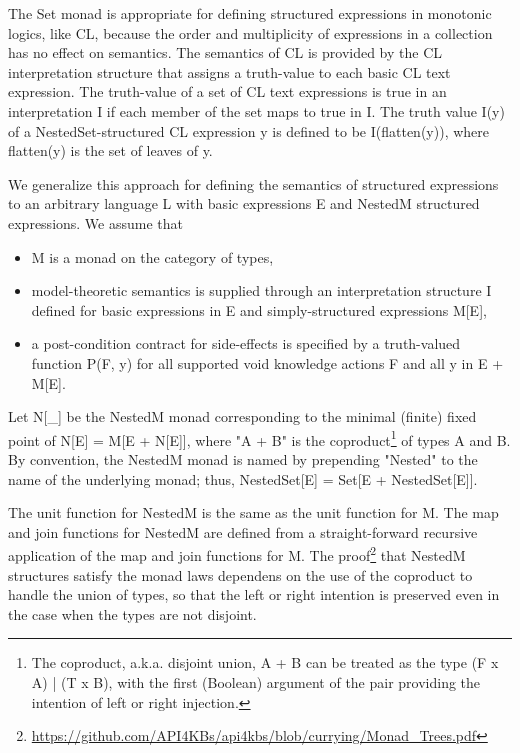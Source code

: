 \documentclass[runningheads]{llncs}
\begin{document}
The Set monad is appropriate for defining structured expressions in monotonic logics, like CL, because the order and multiplicity of expressions in a collection has no effect on semantics. The semantics of CL is provided by the CL interpretation structure that assigns a truth-value to each basic CL text expression. The truth-value of a set of CL text expressions is true in an interpretation I if each member of the set maps to true in I. The truth value I(y) of a NestedSet-structured CL expression y is defined to be I(flatten(y)), where flatten(y) is the set of leaves of y.

We generalize this approach for defining the semantics of structured expressions to an arbitrary language L with basic expressions E and NestedM structured expressions. We assume that 
\begin{itemize}
\item M is a monad on the category of types,
\item model-theoretic semantics is supplied through an interpretation structure I defined for basic expressions in E and simply-structured expressions M[E],
\item a post-condition contract for side-effects is specified by a truth-valued function P(F, y) for all supported void knowledge actions F and all y in E + M[E].
\end{itemize}

Let N[\_] be the NestedM monad corresponding to the minimal (finite) fixed point of N[E] = M[E + N[E]], where "A + B" is the coproduct\footnote{The coproduct, a.k.a. disjoint union, A + B can be treated as the type (F x A) | (T x B), with the first (Boolean) argument of the pair providing the intention of left or right injection.} of types A and B.
By convention, the NestedM monad is named by prepending "Nested" to the name of the underlying monad; thus, NestedSet[E] = Set[E + NestedSet[E]].

The unit function for NestedM is the same as the unit function for M.  The map and join functions for NestedM are defined from a straight-forward recursive application of the map and join functions for M.
The proof\footnote{\url{https://github.com/API4KBs/api4kbs/blob/currying/Monad_Trees.pdf}\label{note:proof}} that NestedM structures satisfy the monad laws dependens on the use of the coproduct to handle the union of types, so that the left or right intention is preserved even in the case when the types are not disjoint. 
\end{document}
